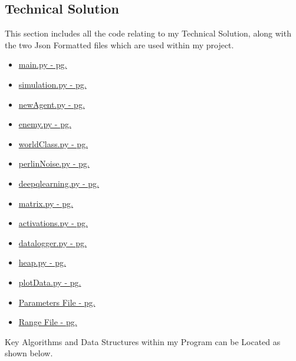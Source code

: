 \begin{flushleft}
    \section{Technical Solution}
        This section includes all the code relating to my Technical Solution, along with the two Json Formatted files which
        are used within my project. 

        \begin{itemize}
            \item \hyperref[sec:main.py]{main.py - pg. \pageref{sec:main.py}}
            \item \hyperref[sec:simulation.py]{simulation.py - pg. \pageref{sec:simulation.py}}
            \item \hyperref[sec:newAgent.py]{newAgent.py - pg. \pageref{sec:newAgent.py}}
            \item \hyperref[sec:enemy.py]{enemy.py - pg. \pageref{sec:enemy.py}}
            \item \hyperref[sec:worldClass.py]{worldClass.py - pg. \pageref{sec:worldClass.py}}
            \item \hyperref[sec:perlinNoise.py]{perlinNoise.py - pg. \pageref{sec:perlinNoise.py}}
            \item \hyperref[sec:deepqlearning.py]{deepqlearning.py - pg. \pageref{sec:deepqlearning.py}}
            \item \hyperref[sec:matrix.py]{matrix.py - pg. \pageref{sec:matrix.py}}
            \item \hyperref[sec:activations.py]{activations.py - pg. \pageref{sec:activations.py}}
            \item \hyperref[sec:datalogger.py]{datalogger.py - pg. \pageref{sec:datalogger.py}}
            \item \hyperref[sec:heap.py]{heap.py - pg. \pageref{sec:heap.py}}
            \item \hyperref[sec:plotData.py]{plotData.py - pg. \pageref{sec:plotData.py}}
            \item \hyperref[sec:paramfile]{Parameters File - pg. \pageref{sec:paramfile}}
            \item \hyperref[sec:rangefile]{Range File - pg. \pageref{sec:rangefile}}
        \end{itemize}

        Key Algorithms and Data Structures within my Program can be Located as shown below.


\end{flushleft}
